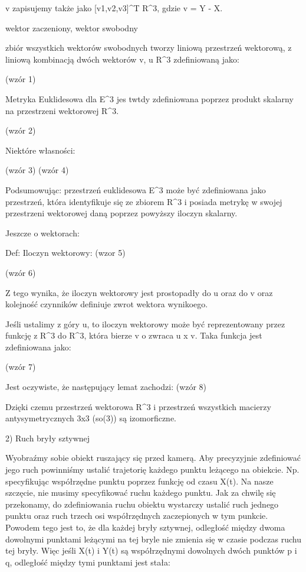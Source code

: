 v zapisujemy także jako [v1,v2,v3]^T \in R^3, gdzie v = Y - X.

wektor zaczeniony, wektor swobodny

zbiór wszystkich wektorów swobodnych tworzy liniową przestrzeń wektorową, z liniową kombinacją dwóch wektorów v, u \in R^3 zdefiniowaną jako:

(wzór 1)

Metryka Euklidesowa dla E^3 jes twtdy zdefiniowana poprzez produkt skalarny na przestrzeni wektorowej R^3.

(wzór 2)

Niektóre własności:

(wzór 3)
(wzór 4)

Podsumowując: przestrzeń euklidesowa E^3 może być zdefiniowana jako przestrzeń, która identyfikuje się ze zbiorem R^3 i posiada metrykę w swojej przestrzeni wektorowej daną poprzez powyższy iloczyn skalarny.

Jeszcze o wektorach: 

Def: Iloczyn wektorowy: (wzor 5)

(wzór 6)

Z tego wynika, że iloczyn wektorowy jest prostopadły do u oraz do v oraz kolejność czynników definiuje zwrot wektora wynikoego. 

Jeśli ustalimy z góry u, to iloczyn wektorowy może być reprezentowany przez funkcję z R^3 do R^3, która bierze v o zwraca u x v. Taka funkcja jest zdefiniowana jako:

(wzór 7)

Jest oczywiste, że następujący lemat zachodzi:
(wzór 8)

Dzięki czemu przestrzeń wektorowa R^3 i przestrzeń wszystkich macierzy antysymetrycznych 3x3 (so(3)) są izomorficzne.

2) Ruch bryły sztywnej

Wyobraźmy sobie obiekt ruszający się przed kamerą. Aby precyzyjnie zdefiniować jego ruch powinniśmy ustalić trajetorię każdego punktu leżącego na obiekcie. Np. specyfikując współrzędne punktu poprzez funkcję od czasu X(t). Na nasze szczęcie, nie musimy specyfikować ruchu każdego punktu. Jak za chwilę się przekonamy, do zdefiniowania ruchu obiektu wystarczy ustalić ruch jednego punktu oraz ruch trzech osi współrzędnych zaczepionych w tym punkcie. Powodem tego jest to, że dla każdej bryły sztywnej, odległość między dwoma dowolnymi punktami leżącymi na tej bryle nie zmienia się w czasie podczas ruchu tej bryły. Więc jeśli X(t) i Y(t) są współrzędnymi dowolnych dwóch punktów p i q, odległość między tymi punktami jest stała:

